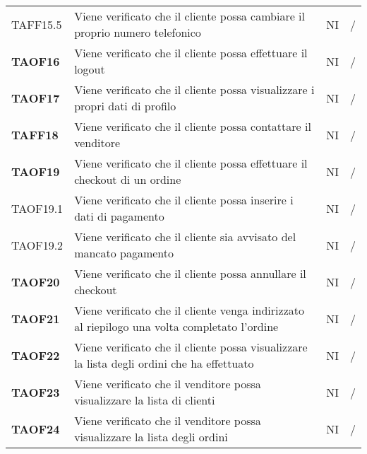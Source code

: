 \begin{center}
\begin{longtable}[!h]{p{60px} p{240px} p{35px} p{35px}}
        TAFF15.5        & Viene verificato che il cliente possa cambiare il proprio numero telefonico                                          & NI             & /              \\
        \textbf{TAOF16} & Viene verificato che il cliente possa effettuare il logout                                                           & NI             & /              \\
        \textbf{TAOF17} & Viene verificato che il cliente possa visualizzare i propri dati di profilo                                          & NI             & /              \\
        \textbf{TAFF18} & Viene verificato che il cliente possa contattare il venditore                                                        & NI             & /              \\
        \textbf{TAOF19} & Viene verificato che il cliente possa effettuare il checkout di un ordine                                            & NI             & /              \\
        TAOF19.1        & Viene verificato che il cliente possa inserire i dati di pagamento                                                   & NI             & /              \\
        TAOF19.2        & Viene verificato che il cliente sia avvisato del mancato pagamento                                                   & NI             & /              \\
        \textbf{TAOF20} & Viene verificato che il cliente possa annullare il checkout                                                          & NI             & /              \\
        \textbf{TAOF21} & Viene verificato che il cliente venga indirizzato al riepilogo una volta completato l'ordine                         & NI             & /              \\
        \textbf{TAOF22} & Viene verificato che il cliente possa visualizzare la lista degli ordini che ha effettuato                           & NI             & /              \\
        \textbf{TAOF23} & Viene verificato che il venditore possa visualizzare la lista di clienti                                             & NI             & /              \\
        \textbf{TAOF24} & Viene verificato che il venditore possa visualizzare la lista degli ordini                                           & NI             & /              \\

\end{longtable}
\end{center}
